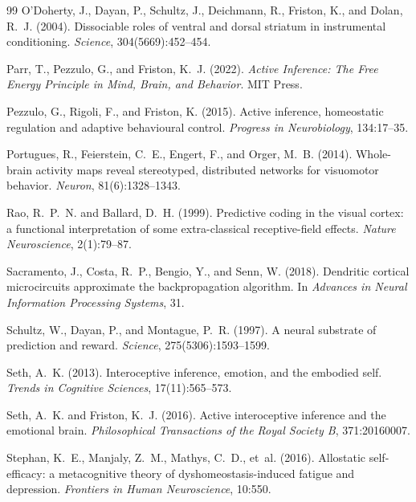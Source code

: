 \documentclass[12pt]{article}
\begin{document}
\begin{thebibliography}{99}
O'Doherty, J., Dayan, P., Schultz, J., Deichmann, R., Friston, K., and Dolan, R.~J. (2004).
Dissociable roles of ventral and dorsal striatum in instrumental conditioning.
\textit{Science}, 304(5669):452--454.

Parr, T., Pezzulo, G., and Friston, K.~J. (2022).
\textit{Active Inference: The Free Energy Principle in Mind, Brain, and Behavior}.
MIT Press.

Pezzulo, G., Rigoli, F., and Friston, K. (2015).
Active inference, homeostatic regulation and adaptive behavioural control.
\textit{Progress in Neurobiology}, 134:17--35.

Portugues, R., Feierstein, C.~E., Engert, F., and Orger, M.~B. (2014).
Whole-brain activity maps reveal stereotyped, distributed networks for visuomotor behavior.
\textit{Neuron}, 81(6):1328--1343.

Rao, R.~P.~N. and Ballard, D.~H. (1999).
Predictive coding in the visual cortex: a functional interpretation of some extra-classical receptive-field effects.
\textit{Nature Neuroscience}, 2(1):79--87.

Sacramento, J., Costa, R.~P., Bengio, Y., and Senn, W. (2018).
Dendritic cortical microcircuits approximate the backpropagation algorithm.
In \textit{Advances in Neural Information Processing Systems}, 31.

Schultz, W., Dayan, P., and Montague, P.~R. (1997).
A neural substrate of prediction and reward.
\textit{Science}, 275(5306):1593--1599.

Seth, A.~K. (2013).
Interoceptive inference, emotion, and the embodied self.
\textit{Trends in Cognitive Sciences}, 17(11):565--573.

Seth, A.~K. and Friston, K.~J. (2016).
Active interoceptive inference and the emotional brain.
\textit{Philosophical Transactions of the Royal Society B}, 371:20160007.

Stephan, K.~E., Manjaly, Z.~M., Mathys, C.~D., et~al. (2016).
Allostatic self-efficacy: a metacognitive theory of dyshomeostasis-induced fatigue and depression.
\textit{Frontiers in Human Neuroscience}, 10:550.


\end{thebibliography}
\end{document}
